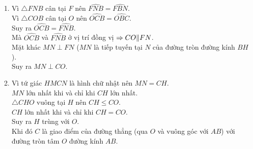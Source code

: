 \begin{bt}
{\begin{enumerate}
		$\triangle HNB$ vuông tại $N$ nên $FH=FB=FN=\dfrac{BH}{2}$.\\
		Suy ra $N$ thuộc đường tròn tâm $F$, đường kính $BH\quad (4)$.\\
		Gọi $MN$ giao với $CH$ tại $E$.\\
		Mà tứ giác $HMCN$ là hình chữ nhật nên $EH=EN=EC=EM$.\\
		Xét $\triangle EHF$ và $\triangle ENF$ có
		$$EH=EN \mbox{ (cmt)}$$
		$$EF \mbox{ cạnh chung}$$
		$$FH=FN \mbox{ (cmt)}$$
		Suy ra $\triangle EHF=\triangle ENF$ (c.c.c).\\
		$\Rightarrow \widehat{EHF}=\widehat{ENF}$.\\
		Mà $\widehat{EHF}=90^\circ$ (gt) $\Rightarrow\widehat{ENF}=90^\circ$.\\
		$\Rightarrow MN\perp FN \quad (5)$.\\
		Từ $(4)$ và $(5)$ suy ra $MN$ là tiếp tuyến của đường tròn đường kính $BH$.
		\item  Vì $\triangle FNB$ cân tại $F$ nên $\widehat{FNB}=\widehat{FBN}$.\\
		Vì $\triangle COB$ cân tại $O$ nên $\widehat{OCB}=\widehat{OBC}$.\\
		Suy ra $\widehat{OCB}=\widehat{FNB}$.\\
		Mà $\widehat{OCB}$ và $\widehat{FNB}$ ở vị trí đồng vị $\Rightarrow CO \Arrowvert FN$.\\
		Mặt khác $MN\perp FN$ ($MN$ là tiếp tuyến tại $N$ của đường tròn đường kính $BH$).\\
		Suy ra $MN\perp CO$.
		\item Vì tứ giác $HMCN$ là hình chữ nhật nên $MN=CH$.\\
		$MN$ lớn nhất khi và chỉ khi $CH$ lớn nhất.\\
		$\triangle CHO$ vuông tại $H$ nên $CH\leq CO$.\\
		$CH$ lớn nhất khi và chỉ khi $CH=CO$.\\
		Suy ra $H$ trùng với $O$.\\
		Khi đó $C$ là giao điểm của đường thẳng (qua $O$ và vuông góc với $AB$) với đường tròn tâm $O$ đường kính $AB$.
		
	\end{enumerate}	
	}
\end{bt}

